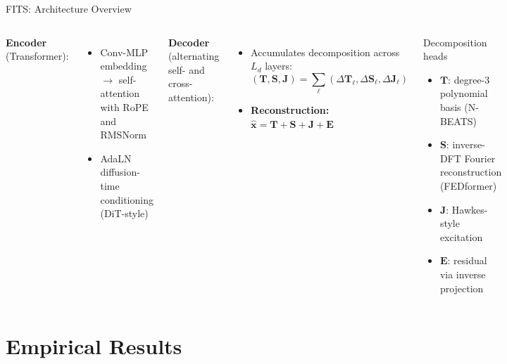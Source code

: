 \documentclass[aspectratio=169,11pt]{beamer}
\begin{document}
\begin{frame}{FITS: Architecture Overview}
  \vspace{6pt}
  \begin{columns}[T]
      \textbf{Encoder} (Transformer):
      \begin{itemize}
        \item Conv-MLP embedding $\to$ self-attention
              with RoPE and RMSNorm
        \item AdaLN diffusion-time conditioning (DiT-style)
      \end{itemize}
      \vspace{6pt}
      \textbf{Decoder} (alternating self- and cross-attention):
      \begin{itemize}
        \item Accumulates decomposition across $L_d$ layers:
          \[
            (\mathbf{T},\mathbf{S},\mathbf{J})
              = \textstyle\sum_\ell
                (\Delta\mathbf{T}_\ell,\Delta\mathbf{S}_\ell,\Delta\mathbf{J}_\ell)
          \]
        \item \textbf{Reconstruction:}
              $\hat{\mathbf{x}} = \mathbf{T}+\mathbf{S}+\mathbf{J}+\mathbf{E}$
      \end{itemize}

      \begin{block}{Decomposition heads}
        \begin{itemize}
          \setlength\itemsep{10pt}
          \item $\mathbf{T}$: degree-3 polynomial basis (N-BEATS)
          \item $\mathbf{S}$: inverse-DFT Fourier reconstruction
                (FEDformer)
          \item $\mathbf{J}$: Hawkes-style excitation
          \item $\mathbf{E}$: residual via inverse projection
        \end{itemize}
      \end{block}
  \end{columns}
\end{frame}


\section{Empirical Results}
\end{document}
